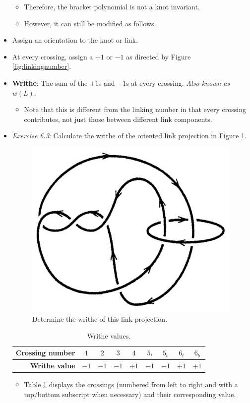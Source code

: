 \documentclass[titlepage]{article}
\numberwithin{figure}{section}
\numberwithin{table}{section}
\numberwithin{equation}{section}
\begin{document}
\begin{itemize}
\begin{itemize}
        \item Therefore, the bracket polynomial is not a knot invariant.
        \item However, it can still be modified as follows.
    \end{itemize}
    \item Assign an orientation to the knot or link.
    \item At every crossing, assign a $+1$ or $-1$ as directed by Figure \ref{fig:linkingnumber}.
    \item \textbf{Writhe}: The sum of the $+1$s and $-1$s at every crossing. \emph{Also known as} $w(L)$.
    \begin{itemize}
        \item Note that this is different from the linking number in that every crossing contributes, not just those between different link components.
    \end{itemize}
    \item \emph{Exercise 6.3}: Calculate the writhe of the oriented link projection in Figure \ref{fig:ex6-3}.
    \begin{figure}[h!]
        \centering
        \includegraphics[width=0.2\linewidth]{Blender/ex6-3.png}
        \caption{Determine the writhe of this link projection.}
        \label{fig:ex6-3}
    \end{figure}
    \begin{table}[h!]
        \centering
        \renewcommand{\arraystretch}{1.4}
        \begin{tabular}{|r|c|c|c|c|c|c|c|c|}
            \hline
            \textbf{Crossing number} & $1$  & $2$  & $3$  & $4$  & $5_t$ & $5_b$ & $6_t$ & $6_b$\\
            \hline
            \textbf{Writhe value}    & $-1$ & $-1$ & $-1$ & $+1$ & $-1$  & $-1$  & $+1$  & $+1$\\
            \hline
        \end{tabular}
        \caption{Writhe values.}
        \label{tab:ex6-3}
    \end{table}
    \begin{itemize}
        \item Table \ref{tab:ex6-3} displays the crossings (numbered from left to right and with a top/bottom subscript when necessary) and their corresponding value.

\end{itemize}
\end{itemize}
\end{document}
